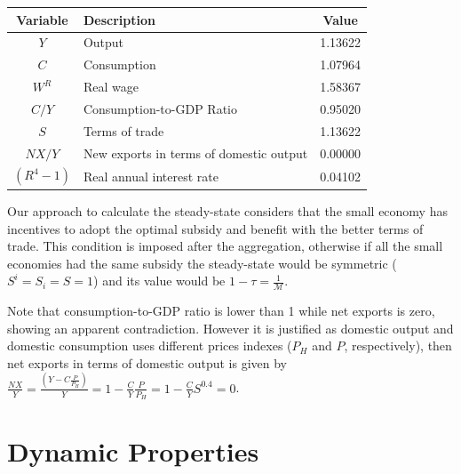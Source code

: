 \documentclass{article}
\begin{document}
\begin{minipage}{0.59\textwidth}
    \begin{table}[H]
        \centering
        \begin{tabular}{clc}
            \hline
            \textbf{Variable} & \textbf{Description} & \textbf{Value}\\
            \hline
            $Y$ & Output & 1.13622 \\
            $C$ & Consumption & 1.07964 \\
            $W^R$ & Real wage & 1.58367 \\
            $C/Y$ & Consumption-to-GDP Ratio & 0.95020 \\
            $S$ & Terms of trade & 1.13622 \\
            $NX/Y$ & New exports in terms of domestic output & $0.00000$\\
            $(R^4 -1)$ & Real annual interest rate &  0.04102\\
            \hline
        \end{tabular}
    \end{table}
\end{minipage}
\begin{minipage}{0.40\textwidth}
    Our approach to calculate the steady-state considers that the small economy has incentives to adopt the optimal subsidy and benefit with the better terms of trade. This condition is imposed after the aggregation, otherwise if all the small economies had the same subsidy the steady-state would be symmetric ($S^i = S_i = S = 1$) and its value would be $1-\tau = \frac{1}{\mathcal M}$.
\end{minipage}

Note that consumption-to-GDP ratio is lower than 1 while net exports is zero, showing an apparent contradiction. However it is justified as domestic output and domestic consumption uses different prices indexes ($P_H$ and $P$, respectively), then net exports in terms of domestic output is given by $\frac{NX}{Y} = \frac{(Y - C \frac{P}{P_H})}{Y} = 1 - \frac{C}{Y} \frac{P}{P_H} = 1 - \frac{C}{Y} S^{0.4} = 0 $.

\section{Dynamic Properties}
\end{document}
